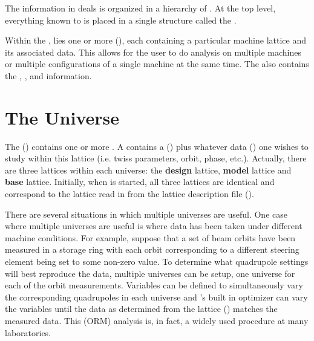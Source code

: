 The information in \tao deals is organized in a hierarchy of
. At the top level, everything known to \tao is
placed in a single structure called the .

Within the , lies one or more 
(), each  containing a particular
machine lattice and its associated data. This allows for the user to
do analysis on multiple machines or multiple configurations of a
single machine at the same time. The  also contains
the , , and  information.

\section{The Universe}
\label{s:universe}

The \tao {} () contains one or
more .  A  contains a 
() plus whatever data () one wishes to
study within this lattice (i.e. twiss parameters, orbit, phase,
etc.). Actually, there are three lattices within each universe: the
\textbf{design} lattice, \textbf{model} lattice and \textbf{base}
lattice. Initially, when \tao is started, all three lattices are
identical and correspond to the lattice read in from the lattice
description file ().

There are several situations in which multiple universes are
useful. One case where multiple universes are useful is where data has
been taken under different machine conditions. For example, suppose
that a set of beam orbits have been measured in a storage ring with
each orbit corresponding to a different steering element being set to some
non-zero value. To determine what
quadrupole settings will best reproduce the data, multiple universes can be
setup, one universe for each of the orbit measurements. Variables can be
defined to simultaneously vary the corresponding quadrupoles in each
universe and \tao's built in optimizer can vary the variables until
the data as determined from the  lattice ()
matches the measured data. This  (ORM) analysis
is, in fact, a widely used procedure at many laboratories.

